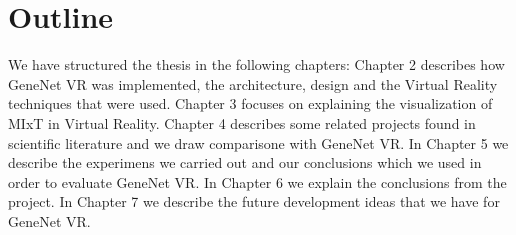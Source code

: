 \section{Outline}

We have structured the thesis in the following chapters: Chapter 2 describes how GeneNet VR was implemented, the architecture, design and the Virtual Reality techniques that were used. Chapter 3 focuses on explaining the visualization of MIxT in Virtual Reality. Chapter 4 describes some related projects found in scientific literature and we draw comparisone with GeneNet VR. In Chapter 5 we describe the experimens we carried out and our conclusions which we used in order to evaluate GeneNet VR. In Chapter 6 we explain the conclusions from the project. In Chapter 7 we describe the future development ideas that we have for GeneNet VR.

